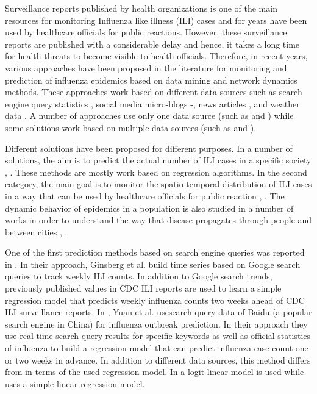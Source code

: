 

Surveillance reports published by health organizations is one of the main resources for monitoring Influenza like illness (ILI) cases and for years have been used by healthcare officials for public reactions. However, these surveillance reports are published with a considerable delay and hence, it takes a long time for health threats to become visible to health officials. Therefore, in recent years, various approaches have been proposed in the literature for monitoring and prediction of influenza epidemics based on data mining and network dynamics methods. These approaches work based on different data sources such as search engine query statistics \cite{ref1}\cite{ref2}, social media micro-blogs \cite{ref3}-\cite{ref7}, news articles \cite{ref8}, and weather data \cite{ref9}. A number of approaches use only one data source (such as \cite{ref1} and \cite{ref4}) while some solutions work based on multiple data sources (such as \cite{ref3} and \cite{ref10}). 

Different solutions have been proposed for different purposes. In a number of solutions, the aim is to predict the actual number of ILI cases in a specific society \cite{ref2}, \cite{ref1}. These methods are mostly work based on regression algorithms. In the second category, the main goal is to monitor the spatio-temporal distribution of ILI cases in a way that can be used by healthcare officials for public reaction \cite{ref3}, \cite{ref4}. The dynamic behavior of epidemics in a population is also studied in a number of works in order to understand the way that disease propagates through people and between cities \cite{ref8}, \cite{ref11}.

One of the first prediction methods based on search engine queries was reported in \cite{ref2}. In their approach, Ginsberg et al. build time series based on Google search queries to track weekly ILI counts. In addition to Google search trends, previously published values in CDC ILI reports are used to learn a simple regression model that predicts weekly influenza counts two weeks ahead of CDC ILI surveillance reports. In \cite{ref1}, Yuan et al. usesearch query data of Baidu (a popular search engine in China) for influenza outbreak prediction. In their approach they use real-time search query results for specific keywords as well as official statistics of influenza to build a regression model that can predict influenza case count one or two weeks in advance. In addition to different data sources, this method differs from \cite{ref2} in terms of the used regression model. In \cite{ref2} a logit-linear model is used while \cite{ref1} uses a simple linear regression model.

